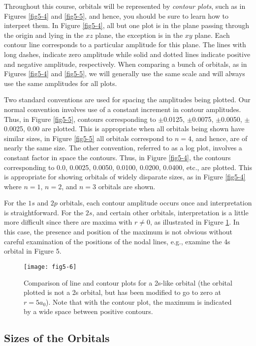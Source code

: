 Throughout this course, orbitals will be represented by \emph{contour
plots}, such as in Figures \ref{fig5-4} and \ref{fig5-5}, and hence,
you should be sure to learn how to interpret them.  In Figure
\ref{fig5-4}, all but one plot is in the plane passing through the
origin and lying in the $xz$ plane, the exception is in the $xy$
plane.  Each contour line corresponds to a particular amplitude for
this plane.  The lines with long dashes, indicate zero amplitude while
solid and dotted lines indicate positive and negative amplitude,
respectively.  When comparing a bunch of orbitals, as in Figures
\ref{fig5-4} and \ref{fig5-5}, we will generally use the same scale
and will always use the same amplitudes for all plots.

Two standard conventions are used for spacing the amplitudes being 
plotted.  Our normal convention involves use of a constant increment in 
contour amplitudes.  Thus, in Figure \ref{fig5-5}, contours corresponding to 
$\pm$0.0125, $\pm$0.0075, $\pm$0.0050, $\pm$0.0025, 0.00 are plotted. This 
is appropriate when all orbitals being shown have similar sizes, in Figure 
\ref{fig5-5} all orbitals correspond to $n = 4$, and hence,
are of nearly the same size. The other convention, referred to as a
log plot, involves a constant factor in space the contours.  Thus, in
Figure \ref{fig5-4}, the contours corresponding to 0.0, 0.0025,
0.0050, 0.0100, 0.0200, 0.0400, etc., are plotted.  This is
appropriate for showing orbitals of widely disparate sizes, as in
Figure \ref{fig5-4} where $n = 1$, $n = 2$, and $n = 3$ orbitals are
shown.

For the $1s$ and $2p$ orbitals, each contour amplitude occurs once and
interpretation is straightforward.  For the $2s$, and certain other
orbitals, interpretation is a little more difficult since there are
maxima with $r \not= 0$, as illustrated in Figure \ref{fig5-6}.  In
this case, the presence and position of the maximum is not obvious
without careful examination of the positions of the nodal lines, e.g.,
examine the 4s orbital in Figure 5.
\begin{figure}
\texttt{[image: fig5-6]}
\caption{Comparison of line
and contour plots for a 2s-like orbital (the orbital plotted is not a
2s orbital, but has been modified to go to zero at $r = 5a_0$).  Note
that with the contour plot, the maximum is indicated by a wide space
between positive contours.}
\label{fig5-6}
\end{figure}

\subsection{Sizes of the Orbitals}

